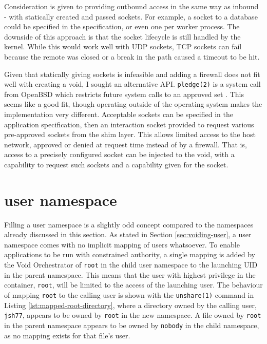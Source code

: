\documentclass[a4paper,12pt,twoside,openright]{report}
\begin{document}
Consideration is given to providing outbound access in the same way as inbound - with statically created and passed sockets. For example, a socket to a database could be specified in the specification, or even one per worker process. The downside of this approach is that the socket lifecycle is still handled by the kernel. While this would work well with UDP sockets, TCP sockets can fail because the remote was closed or a break in the path caused a timeout to be hit.

Given that statically giving sockets is infeasible and adding a firewall does not fit well with creating a void, I sought an alternative API. \texttt{pledge(2)} is a system call from OpenBSD which restricts future system calls to an approved set \citep{the_openbsd_foundation_pledge2_2022}. This seems like a good fit, though operating outside of the operating system makes the implementation very different. Acceptable sockets can be specified in the application specification, then an interaction socket provided to request various pre-approved sockets from the shim layer. This allows limited access to the host network, approved or denied at request time instead of by a firewall. That is, access to a precisely configured socket can be injected to the void, with a capability to request such sockets and a capability given for the socket.

\section{user namespace}
\label{sec:filling-user}

Filling a user namespace is a slightly odd concept compared to the namespaces already discussed in this section. As stated in Section \ref{sec:voiding-user}, a user namespace comes with no implicit mapping of users whatsoever. To enable applications to be run with constrained authority, a single mapping is added by the Void Orchestrator of \texttt{root} in the child user namespace to the launching UID in the parent namespace. This means that the user with highest privilege in the container, \texttt{root}, will be limited to the access of the launching user. The behaviour of mapping \texttt{root} to the calling user is shown with the \texttt{unshare(1)} command in Listing \ref{lst:mapped-root-directory}, where a directory owned by the calling user, \texttt{jsh77}, appears to be owned by \texttt{root} in the new namespace. A file owned by \texttt{root} in the parent namespace appears to be owned by \texttt{nobody} in the child namespace, as no mapping exists for that file's user.
\end{document}
